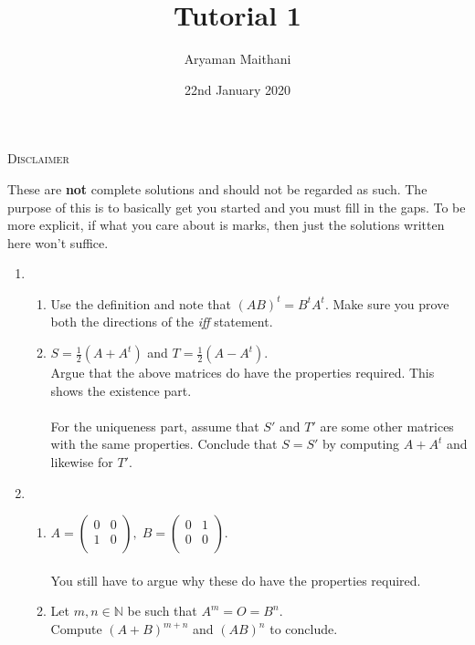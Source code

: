 \documentclass{article}
\title{Tutorial 1}				%
\author{Aryaman Maithani}%
\date{22nd January 2020}		%
\begin{document}
\maketitle

\hrulefill

\begin{center}
	\textsc{Disclaimer}
\end{center}
These are \textbf{not} complete solutions and should not be regarded as such. The purpose of this is to basically get you started and you must fill in the gaps. To be more explicit, if what you care about is marks, then just the solutions written here won't suffice.

\hrulefill

\begin{enumerate} 
	\item \begin{enumerate} 
		\item Use the definition and note that $(AB)^t = B^tA^t$. Make sure you prove both the directions of the \emph{iff} statement.
		\item $S = \frac{1}{2}(A + A^t)$ and $T = \frac{1}{2}(A - A^t).$\\
		Argue that the above matrices do have the properties required. This shows the existence part.\\~\\
		For the uniqueness part, assume that $S'$ and $T'$ are some other matrices with the same properties. Conclude that $S = S'$ by computing $A + A^t$ and likewise for $T'.$
	\end{enumerate}
	\item \begin{enumerate} 
		\item $A = \begin{pmatrix}
			0 & 0\\
			1 & 0\\
		\end{pmatrix},\; B = \begin{pmatrix}
			0 & 1\\
			0 & 0\\
		\end{pmatrix}.$\\~\\
		You still have to argue why these do have the properties required.
		\item Let $m, n \in \mathbb{N}$ be such that $A^m = O = B^n.$\\
		Compute $(A + B)^{m+n}$ and $(AB)^n$ to conclude.
	\end{enumerate}

\end{enumerate}
\end{document}
